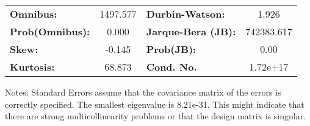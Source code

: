 \begin{center}
\begin{tabular}{lcccccc}
\bottomrule
\end{tabular}
\begin{tabular}{lclc}
\textbf{Omnibus:}       & 1497.577 & \textbf{  Durbin-Watson:     } &     1.926   \\
\textbf{Prob(Omnibus):} &   0.000  & \textbf{  Jarque-Bera (JB):  } & 742383.617  \\
\textbf{Skew:}          &  -0.145  & \textbf{  Prob(JB):          } &      0.00   \\
\textbf{Kurtosis:}      &  68.873  & \textbf{  Cond. No.          } &  1.72e+17   \\
\bottomrule
\end{tabular}
\end{center}

Notes: \newline
 [1] Standard Errors assume that the covariance matrix of the errors is correctly specified. \newline
 [2] The smallest eigenvalue is 8.21e-31. This might indicate that there are \newline
 strong multicollinearity problems or that the design matrix is singular.